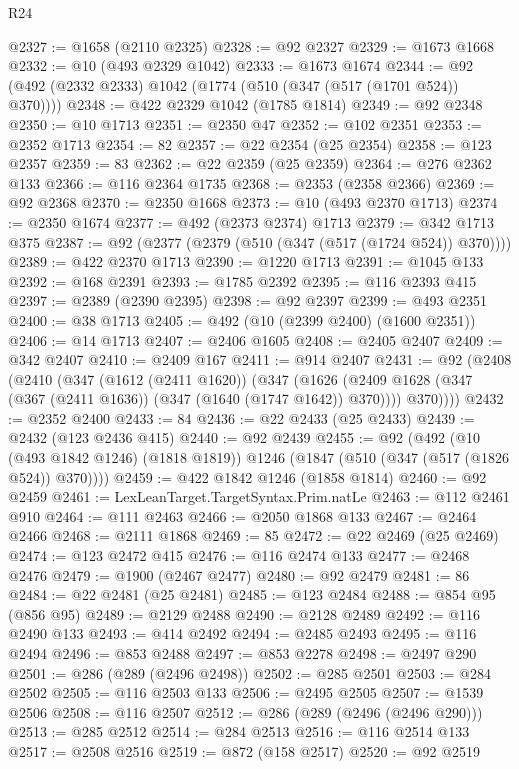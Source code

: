 \begin{lexlean}{R24}
\begin{coremodule}
@2327 := @1658 (@2110 @2325)
@2328 := @92 @2327
@2329 := @1673 @1668
@2332 := @10 (@493 @2329 @1042)
@2333 := @1673 @1674
@2344 := @92 (@492 (@2332 @2333) @1042 (@1774 (@510 (@347 (@517 (@1701 @524)) @370))))
@2348 := @422 @2329 @1042 (@1785 @1814)
@2349 := @92 @2348
@2350 := @10 @1713
@2351 := @2350 @47
@2352 := @102 @2351
@2353 := @2352 @1713
@2354 := 82
@2357 := @22 @2354 (@25 @2354)
@2358 := @123 @2357
@2359 := 83
@2362 := @22 @2359 (@25 @2359)
@2364 := @276 @2362 @133
@2366 := @116 @2364 @1735
@2368 := @2353 (@2358 @2366)
@2369 := @92 @2368
@2370 := @2350 @1668
@2373 := @10 (@493 @2370 @1713)
@2374 := @2350 @1674
@2377 := @492 (@2373 @2374) @1713
@2379 := @342 @1713 @375
@2387 := @92 (@2377 (@2379 (@510 (@347 (@517 (@1724 @524)) @370))))
@2389 := @422 @2370 @1713
@2390 := @1220 @1713
@2391 := @1045 @133
@2392 := @168 @2391
@2393 := @1785 @2392
@2395 := @116 @2393 @415
@2397 := @2389 (@2390 @2395)
@2398 := @92 @2397
@2399 := @493 @2351
@2400 := @38 @1713
@2405 := @492 (@10 (@2399 @2400) (@1600 @2351))
@2406 := @14 @1713
@2407 := @2406 @1605
@2408 := @2405 @2407
@2409 := @342 @2407
@2410 := @2409 @167
@2411 := @914 @2407
@2431 := @92
    (@2408
      (@2410
        (@347
          (@1612 (@2411 @1620))
          (@347
            (@1626 (@2409 @1628 (@347 (@367 (@2411 @1636)) (@347 (@1640 (@1747 @1642)) @370))))
            @370))))
@2432 := @2352 @2400
@2433 := 84
@2436 := @22 @2433 (@25 @2433)
@2439 := @2432 (@123 @2436 @415)
@2440 := @92 @2439
@2455 := @92
    (@492
      (@10 (@493 @1842 @1246) (@1818 @1819))
      @1246
      (@1847 (@510 (@347 (@517 (@1826 @524)) @370))))
@2459 := @422 @1842 @1246 (@1858 @1814)
@2460 := @92 @2459
@2461 := LexLeanTarget.TargetSyntax.Prim.natLe
@2463 := @112 @2461 @910
@2464 := @111 @2463
@2466 := @2050 @1868 @133
@2467 := @2464 @2466
@2468 := @2111 @1868
@2469 := 85
@2472 := @22 @2469 (@25 @2469)
@2474 := @123 @2472 @415
@2476 := @116 @2474 @133
@2477 := @2468 @2476
@2479 := @1900 (@2467 @2477)
@2480 := @92 @2479
@2481 := 86
@2484 := @22 @2481 (@25 @2481)
@2485 := @123 @2484
@2488 := @854 @95 (@856 @95)
@2489 := @2129 @2488
@2490 := @2128 @2489
@2492 := @116 @2490 @133
@2493 := @414 @2492
@2494 := @2485 @2493
@2495 := @116 @2494
@2496 := @853 @2488
@2497 := @853 @2278
@2498 := @2497 @290
@2501 := @286 (@289 (@2496 @2498))
@2502 := @285 @2501
@2503 := @284 @2502
@2505 := @116 @2503 @133
@2506 := @2495 @2505
@2507 := @1539 @2506
@2508 := @116 @2507
@2512 := @286 (@289 (@2496 (@2496 @290)))
@2513 := @285 @2512
@2514 := @284 @2513
@2516 := @116 @2514 @133
@2517 := @2508 @2516
@2519 := @872 (@158 @2517)
@2520 := @92 @2519

\end{coremodule}
\end{lexlean}
